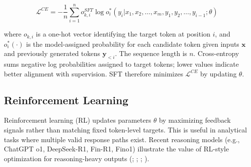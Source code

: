 \begin{equation*}
  \mathcal{L}^{CE} = -\frac{1}{n}\sum_{i=1}^{n} o^{SFT}_{k, i}\log  o^*_i(y_i|x_1, x_2, \dots,x_m, y_1, y_2, \dots, y_{i-1}; \theta)
\end{equation*}



where $o_{k,i}$ is a one-hot vector identifying the target token at position $i$, and $o_i^*(\cdot)$ is the model-assigned probability for each candidate token given inputs $\bm{x}$ and previously generated tokens $\bm{y}_{<i}$. The sequence length is $n$. Cross-entropy sums negative log probabilities assigned to target tokens; lower values indicate better alignment with supervision. SFT therefore minimizes $\mathcal{L}^{CE}$ by updating $\theta$.





\subsection*{Reinforcement Learning}\label{ch2:sec:model_train:rl}

Reinforcement learning (RL) updates parameters $\theta$ by maximizing feedback signals rather than matching fixed token-level targets. This is useful in analytical tasks where multiple valid response paths exist. Recent reasoning models (e.g., ChatGPT o1, DeepSeek-R1, Fin-R1, Fino1) illustrate the value of RL-style optimization for reasoning-heavy outputs (\cite{jaech2024openai}; \cite{guo2025deepseek}; \cite{liu2025fin}; \cite{qian2025fino1}).

